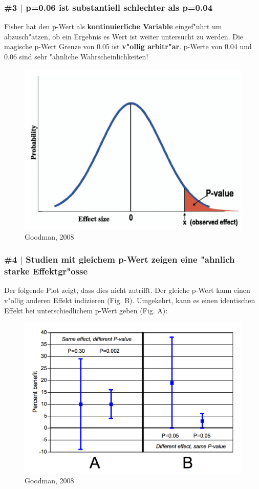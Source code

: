 \documentclass{beamer}
\begin{document}
\begin{frame}
	\frametitle{\#3 $\mid$ p=0.06 ist substantiell schlechter als p=0.04}
	Fisher hat den p-Wert als \textbf{kontinuierliche Variable} eingef"uhrt um abzusch"atzen, ob ein Ergebnis es Wert ist weiter untersucht zu werden. Die magische p-Wert Grenze von 0.05 ist \textbf{v"ollig arbitr"ar}. p-Werte von 0.04 und 0.06 sind sehr "ahnliche Wahrscheinlichkeiten!
	\begin{figure}
		\centering
		\includegraphics[width=0.5\linewidth]{bell_curve}
		\caption{{\footnotesize Goodman, 2008}}
		\label{fig:bell_curve}
	\end{figure}
\end{frame}

\begin{frame}
	\frametitle{\#4 $\mid$ Studien mit gleichem p-Wert zeigen eine "ahnlich starke Effektgr"osse}
	
	Der folgende Plot zeigt, dass dies nicht zutrifft. Der gleiche p-Wert kann einen v"ollig anderen Effekt indizieren (Fig. B). Umgekehrt, kann es einen identischen Effekt bei unterschiedlichem p-Wert geben (Fig. A):
\begin{figure}
\centering
\includegraphics[width=0.65\linewidth]{effect}
\caption{{\footnotesize Goodman, 2008}}
\label{fig:effect}
\end{figure}
\end{frame}
\end{document}
